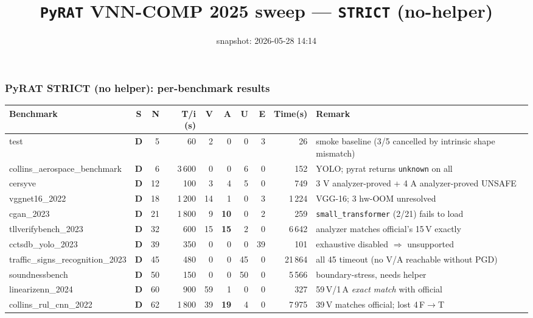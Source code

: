 \documentclass[10pt]{beamer}
\title{\large \texttt{PyRAT} VNN-COMP 2025 sweep --- \texttt{STRICT} (no-helper)}
\date{snapshot: 2026-05-28 14:14}
\newcommand{\sdone}{{\color{cdone}\textbf{D}}}
\begin{document}
\begin{frame}[fragile]
\frametitle{PyRAT STRICT (no helper): per-benchmark results}

\centering\tiny
\setlength{\tabcolsep}{3pt}
\begin{tabular}{l c r r r r r r r l}
\toprule
\textbf{Benchmark} & \textbf{S} & \textbf{N} & \textbf{T/i (s)} & \textbf{V} & \textbf{A} & \textbf{U} & \textbf{E} & \textbf{Time(s)} & \textbf{Remark} \\
\midrule
test                              & \sdone & 5     & 60      & 2            & 0           & 0     & 3   & 26      & smoke baseline (3/5 cancelled by intrinsic shape mismatch) \\
collins\_aerospace\_benchmark     & \sdone & 6     & 3\,600  & 0            & 0           & 6     & 0   & 152     & YOLO; pyrat returns \texttt{unknown} on all \\
cersyve                           & \sdone & 12    & 100     & 3            & 4           & 5     & 0   & 749     & 3 V analyzer-proved + 4 A analyzer-proved UNSAFE \\
vggnet16\_2022                    & \sdone & 18    & 1\,200  & 14           & 1           & 0     & 3   & 1\,224  & VGG-16; 3 hw-OOM unresolved \\
cgan\_2023                        & \sdone & 21    & 1\,800  & 9            & \textbf{10} & 0     & 2   & 259     & \texttt{small\_transformer} (2/21) fails to load \\
tllverifybench\_2023              & \sdone & 32    & 600     & 15           & \textbf{15} & 2     & 0   & 6\,642  & analyzer matches official's 15\,V exactly \\
cctsdb\_yolo\_2023                & \sdone & 39    & 350     & 0            & 0           & 0     & 39  & 101     & exhaustive disabled $\Rightarrow$ unsupported \\
traffic\_signs\_recognition\_2023 & \sdone & 45    & 480     & 0            & 0           & 45    & 0   & 21\,864 & all 45 timeout (no V/A reachable without PGD) \\
soundnessbench                    & \sdone & 50    & 150     & 0            & 0           & 50    & 0   & 5\,566  & boundary-stress, needs helper \\
linearizenn\_2024                 & \sdone & 60    & 900     & 59           & 1           & 0     & 0   & 327     & 59\,V/1\,A \emph{exact match} with official \\
collins\_rul\_cnn\_2022           & \sdone & 62    & 1\,800  & 39           & \textbf{19} & 4     & 0   & 7\,975  & 39\,V matches official; lost 4\,F$\to$T \\

\end{tabular}
\end{frame}
\end{document}
